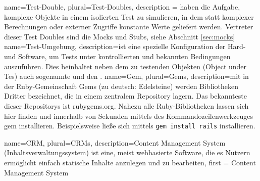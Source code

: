 
 {
  name={Test-Double},
  plural={Test-Doubles},
  description = {haben die Aufgabe, komplexe Objekte in einem isolierten Test zu simulieren, in dem statt komplexer Berechnungen oder externer Zugriffe konstante Werte geliefert werden. Vertreter dieser Test Doubles sind die Mocks und Stubs, siehe Abschnitt
 \ref{sec:mocks}}
}
 {
  name={Test-Umgebung},
  description={ist eine spezielle Konfiguration der Hard- und Software, um Tests unter kontrollierten und bekannten Bedingungen auszuführen. Dies beinhaltet neben dem zu testenden Objekten (Object under Tes) auch sogenannte  und den .}
}
 {
  name={Gem},
  plural={Gems},
  description={mit in der Ruby-Gemeinschaft Gems (zu deutsch: Edelsteine) werden Bibliotheken Dritter bezeichnet, die in einem zentralem Repository lagern. Das bekannteste dieser Repositorys ist rubygems.org. Nahezu alle Ruby-Bibliotheken lassen sich hier finden und innerhalb von Sekunden mittels des Kommandozeilenwerkzeuges gem installieren. Beispielsweise ließe sich  mittels \texttt{gem install rails} installieren.}
}

 {
  name={CRM},
  plural={CRMs},
  description={Content Management System (Inhaltsverwaltungssystem) ist eine, meist webbasierte Software, die es Nutzern ermöglicht einfach statische Inhalte anzulegen und zu bearbeiten},
first = {Content Management System}
}
\newcommand{\glossar}[1]{$^\uparrow$\gls{#1}}

\newcommand{\glossarpl}[1]{$^\uparrow$\glspl{#1}}
\glsaddall

\renewcommand{\glossarypreamble}{Im Folgenden werden einige oft-verwendete Begriffe näher erläutert. Innerhalb des Hauptteils dieser Arbeit sind diese Begriffe mit einem $^\uparrow$ gekennzeichnet}

\printglossary[toctitle=Glossar]

